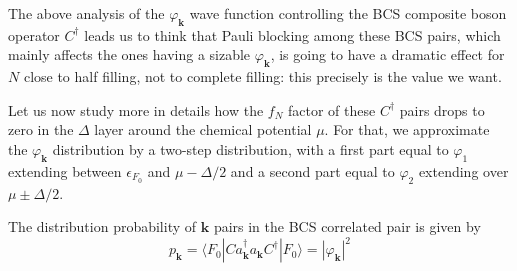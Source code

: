 \documentclass[aps,prb,preprint,groupedaddress,amsmath]{revtex4}
\newcommand{\vk}{\ensuremath{\mathbf{k}}}
\newcommand{\dg}{\ensuremath{\dagger}}
\begin{document}
The above analysis of the $\varphi_\vk$ wave function controlling the BCS composite boson operator $C^\dg$ leads us to think that Pauli blocking among these BCS pairs, which mainly affects the ones having a sizable $\varphi_\vk$, is going to have a dramatic effect for $N$ close to half filling, not to complete filling: this precisely is the value we want. 

Let us now study more in details how the $f_N$ factor of these $C^\dg$ pairs drops to zero in the $\Delta$ layer around the chemical potential $\mu$.  For that, we approximate the $\varphi_\vk$ distribution by a two-step distribution, with a first part equal to $\varphi_1$ extending between $\epsilon_{F_0}$ and $\mu-\Delta/2$ and a second part equal to $\varphi_2$ extending over $\mu\pm\Delta/2$. 


  The distribution probability of $\vk$ pairs in the BCS correlated pair is  given by 
\begin{equation}
p_\vk=\langle{}F_0|Ca^\dg_\vk{}a_\vk{}C^\dg|F_0\rangle=|\varphi_\vk|^2
\end{equation}

%
\end{document}
